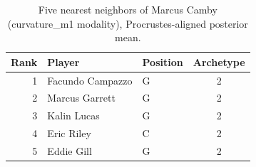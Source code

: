 \begin{table}[htbp]
  \centering\small
  \begin{tabular}{rllc}
    \toprule
    Rank & Player & Position & Archetype \\
    \midrule
    1 & Facundo Campazzo & G & 2 \\
    2 & Marcus Garrett & G & 2 \\
    3 & Kalin Lucas & G & 2 \\
    4 & Eric Riley & C & 2 \\
    5 & Eddie Gill & G & 2 \\
    \bottomrule
  \end{tabular}
  \caption{Five nearest neighbors of Marcus Camby (curvature_m1 modality), Procrustes-aligned posterior mean.}
  \label{tab:Marcus_Camby_neighbors_curvature_m1}
\end{table}

